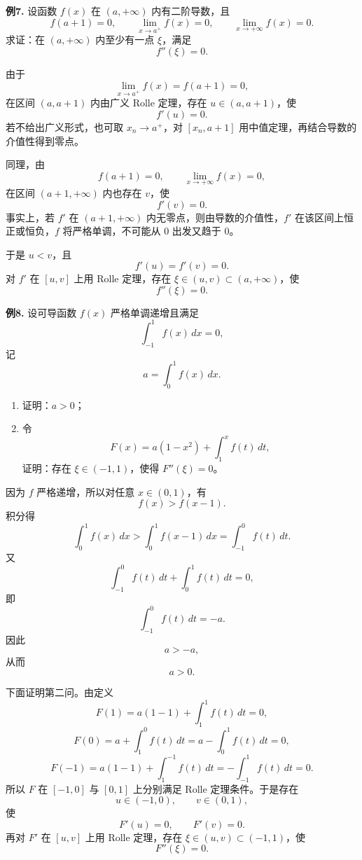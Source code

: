 \begin{problemblock}
\textbf{例7.} 设函数 \(f(x)\) 在 \((a,+\infty)\) 内有二阶导数，且
\[
f(a+1)=0,\qquad \lim_{x\to a^+}f(x)=0,\qquad \lim_{x\to+\infty}f(x)=0.
\]
求证：在 \((a,+\infty)\) 内至少有一点 \(\xi\)，满足
\[
f''(\xi)=0.
\]
\end{problemblock}
\begin{solutionblock}
由于
\[
\lim_{x\to a^+}f(x)=f(a+1)=0,
\]
在区间 \((a,a+1)\) 内由广义 Rolle 定理，存在 \(u\in(a,a+1)\)，使
\[
f'(u)=0.
\]
若不给出广义形式，也可取 \(x_n\to a^+\)，对 \([x_n,a+1]\) 用中值定理，再结合导数的介值性得到零点。

同理，由
\[
f(a+1)=0,\qquad \lim_{x\to+\infty}f(x)=0,
\]
在区间 \((a+1,+\infty)\) 内也存在 \(v\)，使
\[
f'(v)=0.
\]
事实上，若 \(f'\) 在 \((a+1,+\infty)\) 内无零点，则由导数的介值性，\(f'\) 在该区间上恒正或恒负，\(f\) 将严格单调，不可能从 \(0\) 出发又趋于 \(0\)。

于是 \(u<v\)，且
\[
f'(u)=f'(v)=0.
\]
对 \(f'\) 在 \([u,v]\) 上用 Rolle 定理，存在 \(\xi\in(u,v)\subset(a,+\infty)\)，使
\[
f''(\xi)=0.
\]
\end{solutionblock}

\begin{problemblock}
\textbf{例8.} 设可导函数 \(f(x)\) 严格单调递增且满足
\[
\int_{-1}^{1}f(x)\,dx=0,
\]
记
\[
a=\int_0^1 f(x)\,dx.
\]
\begin{enumerate}[label=(\arabic*), leftmargin=2.2em]
\item 证明：\(a>0\)；
\item 令
\[
F(x)=a(1-x^2)+\int_1^x f(t)\,dt,
\]
证明：存在 \(\xi\in(-1,1)\)，使得 \(F''(\xi)=0\)。
\end{enumerate}
\end{problemblock}
\begin{solutionblock}
因为 \(f\) 严格递增，所以对任意 \(x\in(0,1)\)，有
\[
f(x)>f(x-1).
\]
积分得
\[
\int_0^1 f(x)\,dx>\int_0^1 f(x-1)\,dx=\int_{-1}^0 f(t)\,dt.
\]
又
\[
\int_{-1}^0 f(t)\,dt+\int_0^1 f(t)\,dt=0,
\]
即
\[
\int_{-1}^0 f(t)\,dt=-a.
\]
因此
\[
a>-a,
\]
从而
\[
a>0.
\]

下面证明第二问。由定义
\[
F(1)=a(1-1)+\int_1^1 f(t)\,dt=0,
\]
\[
F(0)=a+\int_1^0 f(t)\,dt
=a-\int_0^1 f(t)\,dt=0,
\]
\[
F(-1)=a(1-1)+\int_1^{-1} f(t)\,dt
=-\int_{-1}^{1}f(t)\,dt=0.
\]
所以 \(F\) 在 \([-1,0]\) 与 \([0,1]\) 上分别满足 Rolle 定理条件。于是存在
\[
u\in(-1,0),\qquad v\in(0,1),
\]
使
\[
F'(u)=0,\qquad F'(v)=0.
\]
再对 \(F'\) 在 \([u,v]\) 上用 Rolle 定理，存在 \(\xi\in(u,v)\subset(-1,1)\)，使
\[
F''(\xi)=0.
\]
\end{solutionblock}

